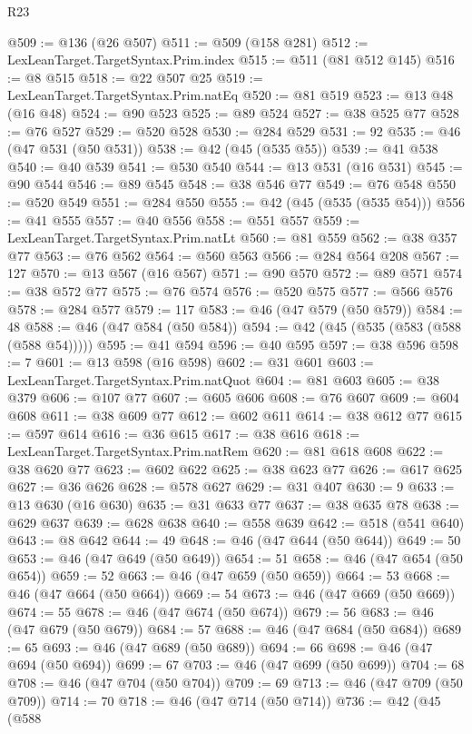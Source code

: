 \begin{lexlean}{R23}
\begin{coremodule}
{{{{{{{{{{{{{{{{{{{{{@509 := @136 (@26 @507)
@511 := @509 (@158 @281)
@512 := LexLeanTarget.TargetSyntax.Prim.index
@515 := @511 (@81 @512 @145)
@516 := @8 @515
@518 := @22 @507 @25
@519 := LexLeanTarget.TargetSyntax.Prim.natEq
@520 := @81 @519
@523 := @13 @48 (@16 @48)
@524 := @90 @523
@525 := @89 @524
@527 := @38 @525 @77
@528 := @76 @527
@529 := @520 @528
@530 := @284 @529
@531 := 92
@535 := @46 (@47 @531 (@50 @531))
@538 := @42 (@45 (@535 @55))
@539 := @41 @538
@540 := @40 @539
@541 := @530 @540
@544 := @13 @531 (@16 @531)
@545 := @90 @544
@546 := @89 @545
@548 := @38 @546 @77
@549 := @76 @548
@550 := @520 @549
@551 := @284 @550
@555 := @42 (@45 (@535 (@535 @54)))
@556 := @41 @555
@557 := @40 @556
@558 := @551 @557
@559 := LexLeanTarget.TargetSyntax.Prim.natLt
@560 := @81 @559
@562 := @38 @357 @77
@563 := @76 @562
@564 := @560 @563
@566 := @284 @564 @208
@567 := 127
@570 := @13 @567 (@16 @567)
@571 := @90 @570
@572 := @89 @571
@574 := @38 @572 @77
@575 := @76 @574
@576 := @520 @575
@577 := @566 @576
@578 := @284 @577
@579 := 117
@583 := @46 (@47 @579 (@50 @579))
@584 := 48
@588 := @46 (@47 @584 (@50 @584))
@594 := @42 (@45 (@535 (@583 (@588 (@588 @54)))))
@595 := @41 @594
@596 := @40 @595
@597 := @38 @596
@598 := 7
@601 := @13 @598 (@16 @598)
@602 := @31 @601
@603 := LexLeanTarget.TargetSyntax.Prim.natQuot
@604 := @81 @603
@605 := @38 @379
@606 := @107 @77
@607 := @605 @606
@608 := @76 @607
@609 := @604 @608
@611 := @38 @609 @77
@612 := @602 @611
@614 := @38 @612 @77
@615 := @597 @614
@616 := @36 @615
@617 := @38 @616
@618 := LexLeanTarget.TargetSyntax.Prim.natRem
@620 := @81 @618 @608
@622 := @38 @620 @77
@623 := @602 @622
@625 := @38 @623 @77
@626 := @617 @625
@627 := @36 @626
@628 := @578 @627
@629 := @31 @407
@630 := 9
@633 := @13 @630 (@16 @630)
@635 := @31 @633 @77
@637 := @38 @635 @78
@638 := @629 @637
@639 := @628 @638
@640 := @558 @639
@642 := @518 (@541 @640)
@643 := @8 @642
@644 := 49
@648 := @46 (@47 @644 (@50 @644))
@649 := 50
@653 := @46 (@47 @649 (@50 @649))
@654 := 51
@658 := @46 (@47 @654 (@50 @654))
@659 := 52
@663 := @46 (@47 @659 (@50 @659))
@664 := 53
@668 := @46 (@47 @664 (@50 @664))
@669 := 54
@673 := @46 (@47 @669 (@50 @669))
@674 := 55
@678 := @46 (@47 @674 (@50 @674))
@679 := 56
@683 := @46 (@47 @679 (@50 @679))
@684 := 57
@688 := @46 (@47 @684 (@50 @684))
@689 := 65
@693 := @46 (@47 @689 (@50 @689))
@694 := 66
@698 := @46 (@47 @694 (@50 @694))
@699 := 67
@703 := @46 (@47 @699 (@50 @699))
@704 := 68
@708 := @46 (@47 @704 (@50 @704))
@709 := 69
@713 := @46 (@47 @709 (@50 @709))
@714 := 70
@718 := @46 (@47 @714 (@50 @714))
@736 := @42
    (@45
      (@588
}}}}}}}}}}}}}}}}}}}}}
\end{coremodule}
\end{lexlean}
